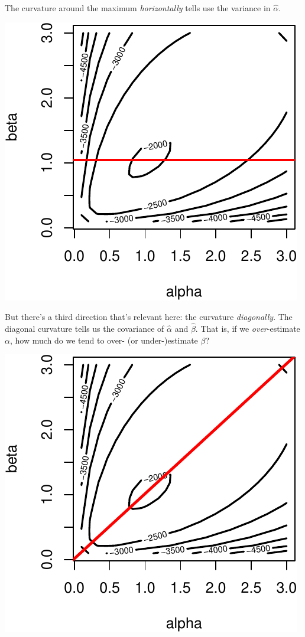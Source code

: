 \documentclass[
]{book}
\begin{document}
The curvature around the maximum \emph{horizontally} tells use the variance in \(\hat{\alpha}\).

\includegraphics{04-02-wald-cis_files/figure-latex/unnamed-chunk-6-1.pdf}

But there's a third direction that's relevant here: the curvature \emph{diagonally}. The diagonal curvature tells us the covariance of \(\hat{\alpha}\) and \(\hat{\beta}\). That is, if we \emph{over}-estimate \(\alpha\), how much do we tend to over- (or under-)estimate \(\beta\)?

\includegraphics{04-02-wald-cis_files/figure-latex/unnamed-chunk-7-1.pdf}
\end{document}
